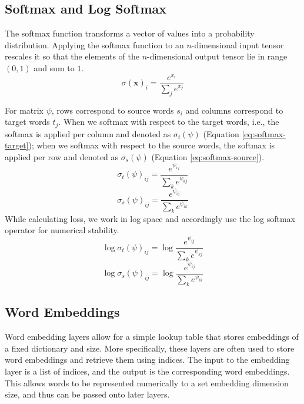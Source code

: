 \documentclass[twoside,twocolumn]{article}
\renewcommand{\vec}[1]{\mathbf{#1}}
\begin{document}
\subsection{Softmax and Log Softmax}
The softmax function transforms a vector of values into a probability
distribution. Applying the softmax function to an $n$-dimensional input tensor
rescales it so that the elements of the $n$-dimensional output tensor lie in
range $(0,1)$ and sum to $1$.
\begin{equation}
  \sigma(\vec{x})_i = \frac{e^{x_i}}{\sum_j e^{x_j}}
\end{equation}

For matrix $\psi$, rows correspond to source words $s_i$ and columns correspond
to target words $t_j$. When we softmax with respect to the target words, i.e.,
the softmax is applied per column and denoted as $\sigma_t(\psi)$
(Equation \ref{eq:softmax-target}); when we softmax with respect to the source
words, the softmax is applied per row and denoted as $\sigma_s(\psi)$
(Equation \ref{eq:softmax-source}).
\begin{equation}
  \label{eq:softmax-target}
  \sigma_t(\psi)_{ij} = \frac{e^{\psi_{ij}}}{\sum_{k} e^{\psi_{kj}}}
\end{equation}
\begin{equation}
  \label{eq:softmax-source}
  \sigma_s(\psi)_{ij} = \frac{e^{\psi_{ij}}}{\sum_{k} e^{\psi_{ik}}}
\end{equation}
While calculating loss, we work in log space and accordingly use the log
softmax operator for numerical stability.
\begin{equation}
  \log \sigma_t(\psi)_{ij} = \log \frac{e^{\psi_{ij}}}{\sum_{k} e^{\psi_{kj}}}
\end{equation}
\begin{equation}
  \log \sigma_s(\psi)_{ij} = \log \frac{e^{\psi_{ij}}}{\sum_{k} e^{\psi_{ik}}}
\end{equation}

\subsection{Word Embeddings}
Word embedding layers allow for a simple lookup table that stores embeddings
of a fixed dictionary and size. More specifically, these layers are often used
to store word embeddings and retrieve them using indices. The input to the
embedding layer is a list of indices, and the output is the corresponding
word embeddings. This allows words to be represented numerically to a set
embedding dimension size, and thus can be passed onto later layers.
\end{document}

